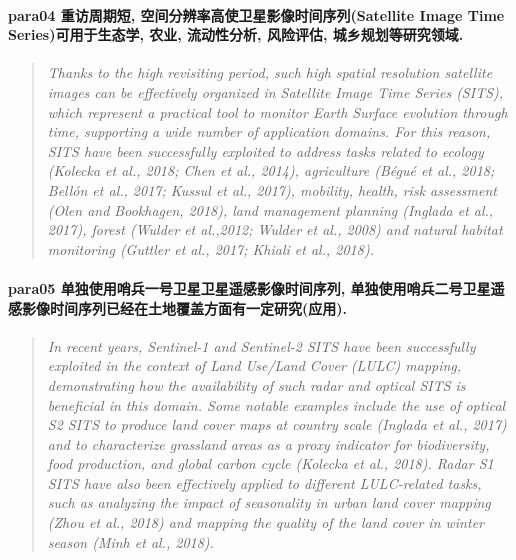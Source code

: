 \paragraph*{para04
    \textcolor[RGB]{17, 205, 29}{重访周期短, 空间分辨率高使卫星影像时间序列(Satellite Image Time Series)可用于生态学, 农业, 流动性分析, 风险评估, 城乡规划等研究领域.}}
\begin{quotation}
    \itshape
    Thanks to the high revisiting period, such high spatial resolution satellite images can be effectively organized in Satellite Image Time Series (SITS), which represent a practical tool to monitor Earth Surface evolution through time, supporting a wide number of application domains. For this reason, SITS have been successfully exploited to address tasks related to ecology (Kolecka et al., 2018; Chen et al., 2014), agriculture (Bégué et al., 2018; Bellón et al., 2017; Kussul et al., 2017), mobility, health, risk assessment (Olen and Bookhagen, 2018), land management planning (Inglada et al., 2017), forest (Wulder et al.,2012; Wulder et al., 2008) and natural habitat monitoring (Guttler et al., 2017; Khiali et al., 2018).
\end{quotation}

\paragraph*{para05
    \textcolor[RGB]{17, 205, 29}{单独使用哨兵一号卫星卫星遥感影像时间序列, 单独使用哨兵二号卫星遥感影像时间序列已经在土地覆盖方面有一定研究(应用).}}
\begin{quotation}
    \itshape
    In recent years, Sentinel-1 and Sentinel-2 SITS have been successfully exploited in the context of Land Use/Land Cover (LULC) mapping, demonstrating how the availability of such radar and optical SITS is beneficial in this domain. Some notable examples include the use of optical S2 SITS to produce land cover maps at country scale (Inglada et al., 2017) and to characterize grassland areas as a proxy indicator for biodiversity, food production, and global carbon cycle (Kolecka et al., 2018). Radar S1 SITS have also been effectively applied to different
    LULC-related tasks, such as analyzing the impact of seasonality in urban land cover mapping (Zhou et al., 2018) and mapping the quality of the land cover in winter season (Minh et al., 2018).
\end{quotation}


